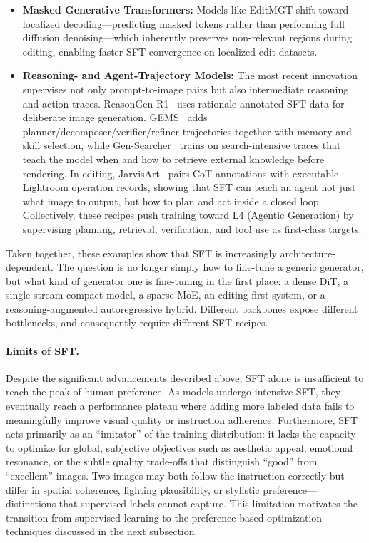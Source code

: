\begin{itemize}[leftmargin=*,itemsep=2pt]
    \item \textbf{Masked Generative Transformers:} Models like EditMGT shift toward localized decoding---predicting masked tokens rather than performing full diffusion denoising---which inherently preserves non-relevant regions during editing, enabling faster SFT convergence on localized edit datasets.
    \item \textbf{Reasoning- and Agent-Trajectory Models:} The most recent innovation supervises not only prompt-to-image pairs but also intermediate reasoning and action traces. ReasonGen-R1~\citep{zhang2025reasongen} uses rationale-annotated SFT data for deliberate image generation. GEMS~\citep{he2026gems} adds planner/decomposer/verifier/refiner trajectories together with memory and skill selection, while Gen-Searcher~\citep{feng2026gen} trains on search-intensive traces that teach the model when and how to retrieve external knowledge before rendering. In editing, JarvisArt~\citep{lin2025jarvisart} pairs CoT annotations with executable Lightroom operation records, showing that SFT can teach an agent not just what image to output, but how to plan and act inside a closed loop. Collectively, these recipes push training toward L4 (Agentic Generation) by supervising planning, retrieval, verification, and tool use as first-class targets.
\end{itemize}

Taken together, these examples show that SFT is increasingly architecture-dependent. The question is no longer simply how to fine-tune a generic generator, but what kind of generator one is fine-tuning in the first place: a dense DiT, a single-stream compact model, a sparse MoE, an editing-first system, or a reasoning-augmented autoregressive hybrid. Different backbones expose different bottlenecks, and consequently require different SFT recipes.

\paragraph{Limits of SFT.}

Despite the significant advancements described above, SFT alone is insufficient to reach the peak of human preference. As models undergo intensive SFT, they eventually reach a performance plateau where adding more labeled data fails to meaningfully improve visual quality or instruction adherence. Furthermore, SFT acts primarily as an ``imitator'' of the training distribution: it lacks the capacity to optimize for global, subjective objectives such as aesthetic appeal, emotional resonance, or the subtle quality trade-offs that distinguish ``good'' from ``excellent'' images. Two images may both follow the instruction correctly but differ in spatial coherence, lighting plausibility, or stylistic preference---distinctions that supervised labels cannot capture. This limitation motivates the transition from supervised learning to the preference-based optimization techniques discussed in the next subsection.


